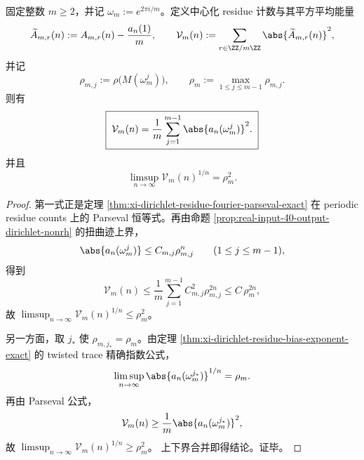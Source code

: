 \begin{theorem}\label{thm:xi-output-residue-l2-energy-exact-exponent}
固定整数 \(m\ge 2\)，并记 \(\omega_m:=e^{2\pi i/m}\)。定义中心化 residue 计数与其平方平均能量
\[
\widetilde A_{m,r}(n):=A_{m,r}(n)-\frac{a_n(1)}{m},
\qquad
\mathcal V_m(n):=\sum_{r\in\ZZ/m\ZZ}\abs{\widetilde A_{m,r}(n)}^2,
\]
并记
\[
\rho_{m,j}:=\rho\!\bigl(M(\omega_m^j)\bigr),
\qquad
\rho_m:=\max_{1\le j\le m-1}\rho_{m,j}.
\]
则有
\[
\boxed{\;
\mathcal V_m(n)=\frac1m\sum_{j=1}^{m-1}\abs{a_n(\omega_m^j)}^2.\;}
\]
并且
\[
\boxed{\;
\limsup_{n\to\infty}\mathcal V_m(n)^{1/n}=\rho_m^2.\;}
\]
\end{theorem}
\begin{proof}
第一式正是定理 \ref{thm:xi-dirichlet-residue-fourier-parseval-exact} 在 periodic residue counts 上的 Parseval 恒等式。再由命题 \ref{prop:real-input-40-output-dirichlet-nonrh} 的扭曲迹上界，
\[
\abs{a_n(\omega_m^j)}\le C_{m,j}\rho_{m,j}^n
\qquad(1\le j\le m-1),
\]
得到
\[
\mathcal V_m(n)
\le
\frac1m\sum_{j=1}^{m-1}C_{m,j}^2\rho_{m,j}^{2n}
\le
C\,\rho_m^{2n},
\]
故
\(
\limsup_{n\to\infty}\mathcal V_m(n)^{1/n}\le \rho_m^2
\)。

另一方面，取 \(j_\ast\) 使 \(\rho_{m,j_\ast}=\rho_m\)。由定理 \ref{thm:xi-dirichlet-residue-bias-exponent-exact} 的 twisted trace 精确指数公式，
\[
\limsup_{n\to\infty}\abs{a_n(\omega_m^{j_\ast})}^{1/n}=\rho_m.
\]
再由 Parseval 公式，
\[
\mathcal V_m(n)\ge \frac1m\abs{a_n(\omega_m^{j_\ast})}^2,
\]
故
\(
\limsup_{n\to\infty}\mathcal V_m(n)^{1/n}\ge \rho_m^2
\)。
上下界合并即得结论。证毕。
\end{proof}

